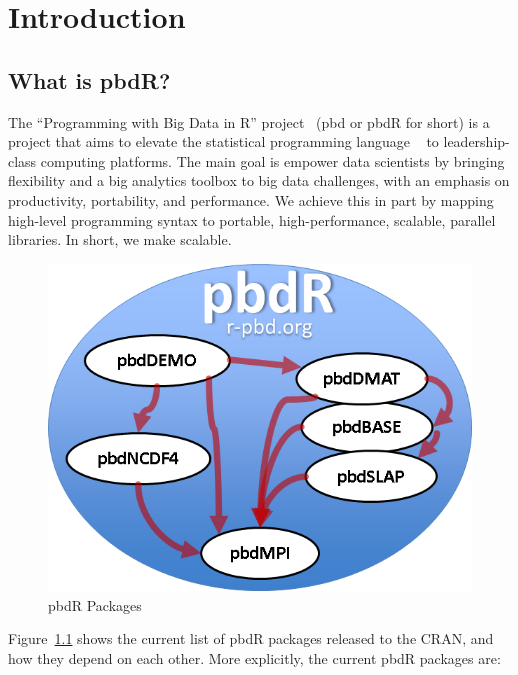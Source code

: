 \chapter[Introduction]{Introduction}
\label{sec:introduction}


\section{What is pbdR?}

The ``Programming with Big Data in R'' project~\citep{pbdR2012} (pbd or pbdR for short) is a project that aims to elevate the statistical programming language ~\citep{Rcore} to leadership-class computing platforms.  The main goal is empower data scientists by bringing flexibility and a big analytics toolbox to big data challenges, with an emphasis on productivity, portability, and performance.  We achieve this in part by mapping high-level programming syntax to portable, high-performance, scalable, parallel libraries.  In short, we make  scalable.

\begin{figure}[h]
 \centering
 \includegraphics[scale=.65]{pbdDEMO-include/pics/pbdR.png}
 \caption{pbdR Packages}
 \label{fig:pbdrpackages}
\end{figure}

Figure~\ref{fig:pbdrpackages} shows the current list of pbdR packages released to the CRAN, and how they depend on each other.  More explicitly, the current pbdR packages are:

